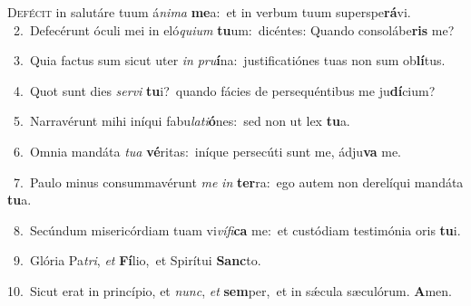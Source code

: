 \lettrine{\initial\textcolor{\initialcolor}{D}}{efécit} in salutáre tuum á\-\textit{ni}\-\textit{ma} \textbf{me}\-a:~\star et in verbum tuum superspe\-\textbf{rá}\-vi.\\
{\numbfont\textcolor{\numbcolor}{~2.}}~Defecérunt óculi mei in eló\-\textit{qui}\-\textit{um} \textbf{tu}\-um:~\star dicéntes: Quando consolábe\textbf{ris} me?\par
{\numbfont\textcolor{\numbcolor}{~3.}}~Quia factus sum sicut uter \textit{in} \textit{pru}\-\textbf{í}na:~\star justificatiónes tuas non sum ob\-\textbf{lí}\-tus.\par
{\numbfont\textcolor{\numbcolor}{~4.}}~Quot sunt dies \textit{ser}\-\textit{vi} \textbf{tu}\-i?~\star quando fácies de persequéntibus me ju\-\textbf{dí}\-cium?\par
{\numbfont\textcolor{\numbcolor}{~5.}}~Narravérunt mihi iníqui fabu\-\textit{la}\-\textit{ti}\textbf{ó}nes:~\star sed non ut lex \textbf{tu}\-a.\par
{\numbfont\textcolor{\numbcolor}{~6.}}~Omnia mandáta \textit{tu}\-\textit{a} \textbf{vé}\-ritas:~\star iníque persecúti sunt me, ádju\textbf{va} me.\par
{\numbfont\textcolor{\numbcolor}{~7.}}~Paulo minus consummavérunt \textit{me} \textit{in} \textbf{ter}\-ra:~\star ego autem non derelíqui mandáta \textbf{tu}\-a.\par
{\numbfont\textcolor{\numbcolor}{~8.}}~Secúndum misericórdiam tuam vi\-\textit{ví}\-\textit{fi}\textbf{ca} me:~\star et custódiam testimónia oris \textbf{tu}\-i.\par
{\numbfont\textcolor{\numbcolor}{~9.}}~Glória Pa\-\textit{tri}\-, \textit{et} \textbf{Fí}\-lio,~\star et Spirítui \textbf{Sanc}\-to.\par
{\numbfont\textcolor{\numbcolor}{10.}}~Sicut erat in princípio, et \textit{nunc}\-, \textit{et} \textbf{sem}\-per,~\star et in sǽcula sæculórum. \textbf{A}\-men.\par
